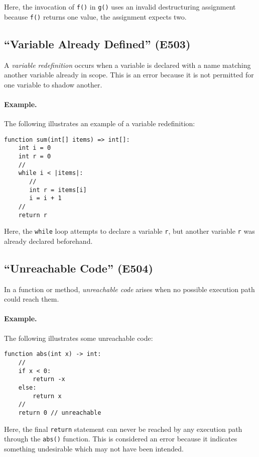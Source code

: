 Here, the invocation of \lstinline{f()} in \lstinline{g()} uses an invalid destructuring assignment because \lstinline{f()} returns one value, the assignment expects two.

\subsection{``Variable Already Defined'' (E503)}

A {\em variable redefinition} occurs when a variable is declared with a name matching another variable already in scope.  This is an error because it is not permitted for one variable to shadow another.

\paragraph{Example.}  The following illustrates an example of a variable redefinition:

\begin{lstlisting}
function sum(int[] items) => int[]:
    int i = 0
    int r = 0
    //
    while i < |items|:
       //
       int r = items[i]
       i = i + 1
    //
    return r
\end{lstlisting}

Here, the \lstinline{while} loop attempts to declare a variable \lstinline{r}, but another variable \lstinline{r} was already declared beforehand.

\subsection{``Unreachable Code'' (E504)}

In a function or method, {\em unreachable code} arises when no possible execution path could reach them.  

\paragraph{Example.} The following illustrates some unreachable code:

\begin{lstlisting}
function abs(int x) -> int:
    //
    if x < 0:
        return -x
    else:
        return x
    //
    return 0 // unreachable
\end{lstlisting}

Here, the final \lstinline{return} statement can never be reached by any execution path through the \lstinline{abs()} function.  This is considered an error because it indicates something undesirable which may not have been intended.

